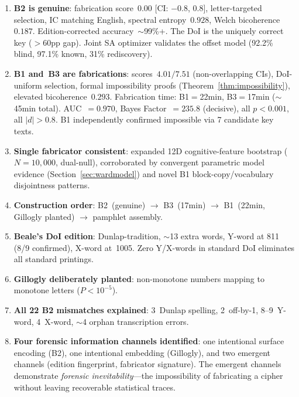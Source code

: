 \documentclass[11pt,a4paper]{article}
\begin{document}
\begin{enumerate}
    \item \textbf{B2 is genuine}: fabrication score~0.00 [CI: $-0.8$, $0.8$],
          letter-targeted selection, IC matching English, spectral entropy~$0.928$,
          Welch bicoherence~$0.187$. Edition-corrected accuracy~$\sim$99\%+. The DoI
          is the uniquely correct key ($>$60pp gap). Joint SA optimizer validates
          the offset model (92.2\% blind, 97.1\% known, 31\% rediscovery).

    \item \textbf{B1 and~B3 are fabrications}: scores~$4.01/7.51$ (non-overlapping CIs),
          DoI-uniform selection, formal impossibility proofs
          (Theorem~\ref{thm:impossibility}), elevated bicoherence~$0.293$.
          Fabrication time: B1$=$22min, B3$=$17min ($\sim$45min total). AUC~$= 0.970$,
          Bayes Factor~$= 235.8$ (decisive),
          all $p < 0.001$, all $|d| > 0.8$. B1 independently confirmed impossible
          via 7 candidate key texts.

    \item \textbf{Single fabricator consistent}: expanded 12D cognitive-feature
          bootstrap ($N{=}10{,}000$, dual-null), corroborated by convergent parametric
          model evidence (Section~\ref{sec:wardmodel}) and novel B1 block-copy/vocabulary
          disjointness patterns.

    \item \textbf{Construction order}: B2~(genuine) $\to$ B3~(17min) $\to$
          B1~(22min, Gillogly planted) $\to$ pamphlet assembly.

    \item \textbf{Beale's DoI edition}: Dunlap-tradition, $\sim$13 extra words,
          Y-word at 811 (8/9 confirmed), X-word at~1005. Zero Y/X-words in
          standard DoI eliminates all standard printings.

    \item \textbf{Gillogly deliberately planted}: non-monotone numbers mapping
          to monotone letters ($P < 10^{-5}$).

    \item \textbf{All 22 B2 mismatches explained}: 3~Dunlap spelling, 2~off-by-1,
          8--9~Y-word, 4~X-word, $\sim$4 orphan transcription errors.

    \item \textbf{Four forensic information channels identified}: one intentional
          surface encoding (B2), one intentional embedding (Gillogly), and two
          emergent channels (edition fingerprint, fabricator signature). The emergent
          channels demonstrate \emph{forensic inevitability}---the impossibility of
          fabricating a cipher without leaving recoverable statistical traces.
\end{enumerate}
\end{document}
